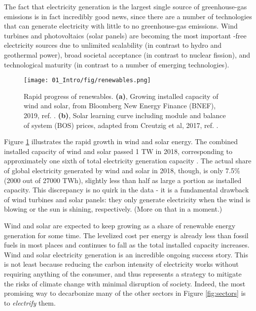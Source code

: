 The fact that electricity generation is the largest single source of greenhouse-gas emissions is in fact incredibly good news, since there are a number of technologies that can generate electricity with little to no greenhouse-gas emissions. Wind turbines and photovoltaics (solar panels) are becoming the most important -free electricity sources due to unlimited scalability (in contrast to hydro and geothermal power), broad societal acceptance (in contrast to nuclear fission), and technological maturity (in contrast to a number of emerging technologies)\cite{BNEF2018, Creutzig2017}. 
\begin{figure}[h!]
	\centering
	\texttt{[image: 01\_Intro/fig/renewables.png]}
	\caption{Rapid progress of renewables. \textbf{(a)}, Growing installed capacity of wind and solar, from Bloomberg New Energy Finance (BNEF), 2019, ref. . \textbf{(b)}, Solar learning curve including module and balance of system (BOS) prices, adapted from Creutzig et al, 2017, ref. .}
	\label{fig:renewables}
\end{figure}
Figure \ref{fig:renewables} illustrates the rapid growth in wind and solar energy. The combined installed capacity of wind and solar passed 1 TW\cite{BNEF2018} in 2018, corresponding to approximately one sixth of total electricity generation capacity \cite{IRENA2019}. The actual share of global electricity generated by wind and solar in 2018, though, is only 7.5\% (2000 out of 27000 TWh)\cite{Enerdata2019}, slightly less than half as large a portion as installed capacity. This discrepancy is no quirk in the data - it is a fundamental drawback of wind turbines and solar panels: they only generate electricity when the wind is blowing or the sun is shining, respectively. (More on that in a moment.)

Wind and solar are expected to keep growing as a share of renewable energy generation for some time. The levelized cost per energy is already less than fossil fuels in most places and continues to fall as the total installed capacity increases\cite{Bloomberg2016, Creutzig2017}. Wind and solar electricity generation is an incredible ongoing success story. This is not least because reducing the carbon intensity of electricity works without requiring anything of the consumer, and thus represents a strategy to mitigate the risks of climate change with minimal disruption of society. Indeed, the most promising way to decarbonize many of the other sectors in Figure \ref{fig:sectors} is to \textit{electrify} them. 

